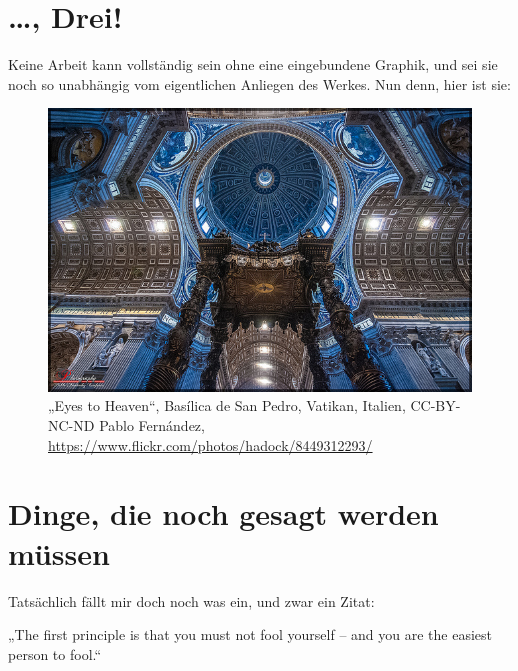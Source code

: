 \documentclass{scrbook}
\begin{document}
\chapter{\dots, Drei!}
\label{cha:drei}

Keine Arbeit kann vollständig sein ohne eine eingebundene Graphik, und sei sie
noch so unabhängig vom eigentlichen Anliegen des Werkes.  Nun denn, hier ist
sie:

\begin{figure}[h]
  \centering
  \includegraphics[width=\linewidth]{eyes-to-heaven.jpg}
  \caption{„Eyes to Heaven“, Basílica de San Pedro, Vatikan, Italien,
    CC-BY-NC-ND Pablo Fernández,
    \url{https://www.flickr.com/photos/hadock/8449312293/} }
  \label{fig:basilica-de-san-pedro}
\end{figure}

\appendix

\chapter{Dinge, die noch gesagt werden müssen}
\label{cha:dinge-die-noch}

Tatsächlich fällt mir doch noch was ein, und zwar ein Zitat:

\begin{displayquote}
  „The first principle is that you must not fool yourself – and you are the
  easiest person to fool.“
\end{displayquote}

\backmatter

\printbibliography{}

\printindex
\end{document}
